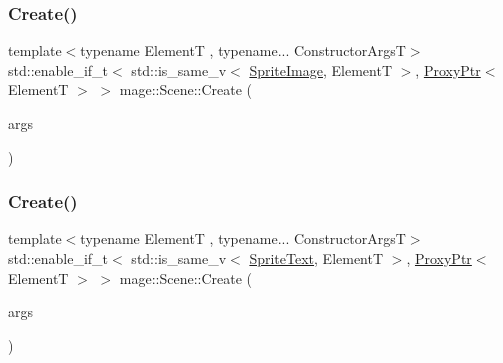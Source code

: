 \hypertarget{classmage_1_1_scene_ae91da18ed230dddb5ed8f421773bb874}{}\label{classmage_1_1_scene_ae91da18ed230dddb5ed8f421773bb874} 
\subsubsection{\texorpdfstring{Create()}{Create()}\hspace{0.1cm}{\footnotesize\ttfamily [9/11]}}
{\footnotesize\ttfamily template$<$typename ElementT , typename... Constructor\+ArgsT$>$ \\
std\+::enable\+\_\+if\+\_\+t$<$ std\+::is\+\_\+same\+\_\+v$<$ \hyperlink{classmage_1_1_sprite_image}{Sprite\+Image}, ElementT $>$, \hyperlink{classmage_1_1_proxy_ptr}{Proxy\+Ptr}$<$ ElementT $>$ $>$ mage\+::\+Scene\+::\+Create (\begin{DoxyParamCaption}\item[{Constructor\+ArgsT \&\&...}]{args }\end{DoxyParamCaption})}

\hypertarget{classmage_1_1_scene_a3232b0b2c5105a03326d7d05b5c6198b}{}\label{classmage_1_1_scene_a3232b0b2c5105a03326d7d05b5c6198b} 
\subsubsection{\texorpdfstring{Create()}{Create()}\hspace{0.1cm}{\footnotesize\ttfamily [10/11]}}
{\footnotesize\ttfamily template$<$typename ElementT , typename... Constructor\+ArgsT$>$ \\
std\+::enable\+\_\+if\+\_\+t$<$ std\+::is\+\_\+same\+\_\+v$<$ \hyperlink{classmage_1_1_sprite_text}{Sprite\+Text}, ElementT $>$, \hyperlink{classmage_1_1_proxy_ptr}{Proxy\+Ptr}$<$ ElementT $>$ $>$ mage\+::\+Scene\+::\+Create (\begin{DoxyParamCaption}\item[{Constructor\+ArgsT \&\&...}]{args }\end{DoxyParamCaption})}

\hypertarget{classmage_1_1_scene_aab7992ccdf1e98213ed3cb96b6d376e2}{}\label{classmage_1_1_scene_aab7992ccdf1e98213ed3cb96b6d376e2} 
